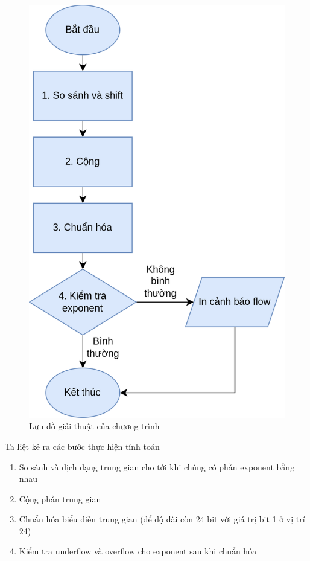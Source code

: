 \begin{figure}
\centering
\includegraphics{img/algo_flowchart.png}
\caption{Lưu đồ giải thuật của chương trình}
\end{figure}

Ta liệt kê ra các bước thực hiện tính toán

\begin{enumerate}
\def\labelenumi{\arabic{enumi}.}
\item
  So sánh và dịch dạng trung gian cho tới khi chúng có phần exponent
  bằng nhau
\item
  Cộng phần trung gian
\item
  Chuẩn hóa biểu diễn trung gian (để độ dài còn 24 bit với giá trị bit 1
  ở vị trí 24)
\item
  Kiểm tra underflow và overflow cho exponent sau khi chuẩn hóa
\end{enumerate}

